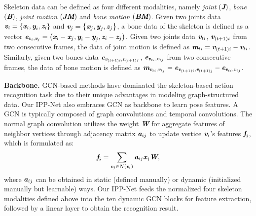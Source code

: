 \documentclass[runningheads]{llncs}
\begin{document}
Skeleton data can be defined as four different modalities, namely \textit{joint} $(\textit{\textbf{J}})$, \textit{bone} $(\textit{\textbf{B}})$, \textit{joint motion} $(\textit{\textbf{JM}})$ and \textit{bone motion} $(\textit{\textbf{BM}})$. Given two joints data $\textit{\textbf{v}}_{i} = \left\{\textit{\textbf{x}}_{i}, \textit{\textbf{y}}_{i}, \textit{\textbf{z}}_{i} \right\}$ and $\textit{\textbf{v}}_{j} = \left\{\textit{\textbf{x}}_{j}, \textit{\textbf{y}}_{j}, \textit{\textbf{z}}_{j} \right\}$, a bone data of the skeleton is defined as a vector $\textit{\textbf{e}}_{\textit{\textbf{v}}_{i}, \textit{\textbf{v}}_{j}} = \left(\textit{\textbf{x}}_{i}-\textit{\textbf{x}}_{j}, \textit{\textbf{y}}_{i}-\textit{\textbf{y}}_{j}, \textit{\textbf{z}}_{i}-\textit{\textbf{z}}_{j} \right)$. Given two joints data $\textit{\textbf{v}}_{ti}$, $\textit{\textbf{v}}_{(t+1)i}$ from two consecutive frames, the data of joint motion is defined as $\textit{\textbf{m}}_{ti} = \textit{\textbf{v}}_{(t+1)i} - \textit{\textbf{v}}_{ti}$. Similarly, given two bones data $\textit{\textbf{e}}_{\textit{\textbf{v}}_{(t+1)i},\textit{\textbf{v}}_{(t+1)j}}$, $\textit{\textbf{e}}_{\textit{\textbf{v}}_{ti},\textit{\textbf{v}}_{tj}}$ from two consecutive frames, the data of bone motion is defined as $\textit{\textbf{m}}_{\textit{\textbf{v}}_{ti},\textit{\textbf{v}}_{tj}} = \textit{\textbf{e}}_{\textit{\textbf{v}}_{(t+1)i},\textit{\textbf{v}}_{(t+1)j}} - \textit{\textbf{e}}_{\textit{\textbf{v}}_{ti},\textit{\textbf{v}}_{tj}}$.

\textbf{Backbone.} GCN-based methods have dominated the skeleton-based action recognition task due to their unique advantages in modeling graph-structured data. Our IPP-Net also embraces GCN as backbone to learn pose features. A GCN is typically composed of graph convolutions and temporal convolutions. The normal graph convolution utilizes the weight \textit{\textbf{W}} for aggregate features of neighbor vertices through adjacency matrix $\textit{\textbf{a}}_{ij}$ to update vertice $\textit{\textbf{v}}_{i}$’s features $\textit{\textbf{f}}_{i}$, which is formulated as:
\begin{equation}
\textit{\textbf{f}}_{i} = \sum_{\textit{\textbf{v}}_{j} \in N(\textit{\textbf{v}}_{i})}\textit{\textbf{a}}_{ij}\textit{\textbf{x}}_{j}\textit{\textbf{W}},
\label{con:Equation1}
\end{equation}
where $\textit{\textbf{a}}_{ij}$ can be obtained in static (defined manually) or dynamic (initialized manually but learnable) ways. Our IPP-Net feeds the normalized four skeleton modalities defined above into the ten dynamic GCN blocks for feature extraction, followed by a linear layer to obtain the recognition result.
\end{document}
